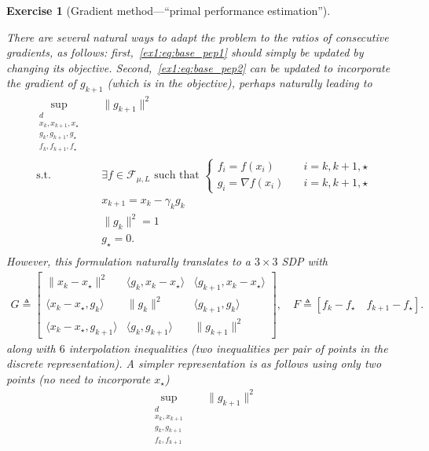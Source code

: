 \documentclass[11pt,a4paper]{article}
\newcommand{\inner}[2]{{\langle #1, #2\rangle}}
\newtheorem{exercise}{Exercise}
\begin{document}
\begin{exercise}[Gradient method---``primal performance estimation'']
\begin{enumerate}
{	There are several natural ways to adapt the problem to the ratios of consecutive gradients, as follows: first,~\eqref{ex1:eq:base_pep1} should simply be updated by changing its objective. Second,~\eqref{ex1:eq:base_pep2} can be updated to incorporate the gradient of $g_{k+1}$ (which is in the objective), perhaps naturally leading to
	\begin{equation*}
		\begin{aligned}
		\sup_{\substack{d\\x_k,x_{k+1},x_\star\\g_k,g_{k+1},g_\star\\f_k,f_{k+1},f_\star}} \quad & \|g_{k+1}\|^2\\
		\text{s.t. } & \exists f\in\mathcal{F}_{\mu,L} \text{ such that }\left\{\begin{array}{ll}
			f_i=f(x_i)\quad & i=k,k+1,\star\\
			g_i=\nabla f(x_i)\quad & i=k,k+1,\star
			\end{array}\right.\\
		& x_{k+1}=x_k-\gamma_k  g_k\\
		& \|g_k\|^2= 1\\
		& g_\star=0.\\
		\end{aligned}
		\end{equation*}
	However, this formulation naturally translates to a $3\times 3$ SDP with
			\begin{align*}
			G \triangleq \begin{bmatrix}
			\|x_k-x_\star\|^2 & \inner{ g_k}{x_k-x_\star} & \inner{g_{k+1}}{x_k-x_\star}\\
			\inner{x_k-x_\star}{g_k} & \| g_k\|^2 & \inner{ g_{k+1}}{g_k}\\
			\inner{x_k-x_\star}{g_{k+1}} & \inner{g_k}{g_{k+1}} & \|g_{k+1}\|^2
			\end{bmatrix},\quad 	F \triangleq 			[f_k-f_\star\quad f_{k+1}-f_\star].
			\end{align*}
	along with $6$ interpolation inequalities (two inequalities per pair of points in the discrete representation). A simpler representation is as follows using only two points (no need to incorporate $x_\star$)
	\begin{equation*}
		\begin{aligned}
		\sup_{\substack{d\\x_k,x_{k+1}\\g_k,g_{k+1}\\f_k,f_{k+1}}} \quad & \|g_{k+1}\|^2\\

\end{aligned}
\end{equation*}}
\end{enumerate}
\end{exercise}
\end{document}
